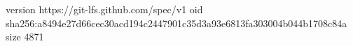 version https://git-lfs.github.com/spec/v1
oid sha256:a8494e27d66cec30acd194c2447901c35d3a93e6813fa303004b044b1708c84a
size 4871
